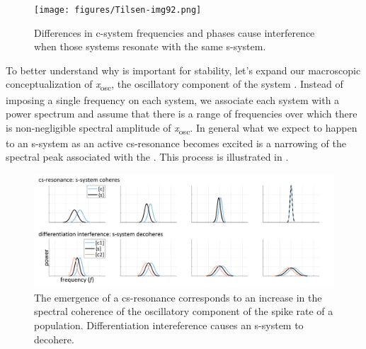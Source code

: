   
\begin{figure}
\texttt{[image: figures/Tilsen-img92.png]}
\caption{Differences in c-system frequencies and phases cause interference when those systems resonate with the same s-system.}
\label{fig:4:42}
\end{figure}
 

  To better understand why  is important for stability, let's expand our macroscopic conceptualization of \textit{x}\textsubscript{osc}, the oscillatory component of the system . Instead of imposing a single frequency on each system, we associate each system with a power spectrum and assume that there is a range of frequencies over which there is non-negligible spectral amplitude of \textit{x}\textsubscript{osc}. In general what we expect to happen to an s-system as an active cs-resonance becomes excited is a narrowing of the spectral peak associated with the . This process is illustrated in {}.

  
\begin{figure}
\includegraphics[width=\textwidth]{figures/Tilsen-img93.png}
\caption{The emergence of a cs-resonance corresponds to an increase in the spectral coherence of the oscillatory component of the spike rate of a population. Differentiation intereference causes an s-system to decohere.}
\label{fig:4:43}
\end{figure}
 


